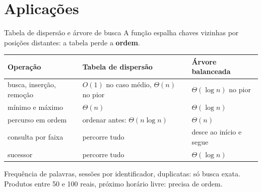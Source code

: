 \documentclass{beamer}
\begin{document}
\section{Aplicações}

\begin{frame}{Tabela de dispersão e árvore de busca}
	A função espalha chaves vizinhas por posições distantes: a tabela perde a
	\textbf{ordem}.

	\vspace{0.3cm}
	\begin{center}
		\scriptsize
		\begin{tabular}{>{\raggedright\arraybackslash}p{2.8cm}
			>{\raggedright\arraybackslash}p{3.4cm}
			>{\raggedright\arraybackslash}p{3cm}}
			\toprule
			\textbf{Operação}        & \textbf{Tabela de dispersão}                       & \textbf{Árvore balanceada}  \\
			\midrule
			busca, inserção, remoção & $O(1)$ no caso médio, $\Theta(n)$ no pior          & $\Theta(\log n)$ no pior    \\
			mínimo e máximo          & $\Theta(n)$                                        & $\Theta(\log n)$            \\
			percurso em ordem        & ordenar antes: $\Theta(n \log n)$                  & $\Theta(n)$                 \\
			consulta por faixa       & percorre tudo                                      & desce ao início e segue     \\
			sucessor                 & percorre tudo                                      & $\Theta(\log n)$            \\
			\bottomrule
		\end{tabular}
	\end{center}

	\vspace{0.3cm}
	\small
	Frequência de palavras, sessões por identificador, duplicatas: só busca exata.
	Produtos entre 50 e 100 reais, próximo horário livre: precisa de ordem.
\end{frame}
\end{document}
